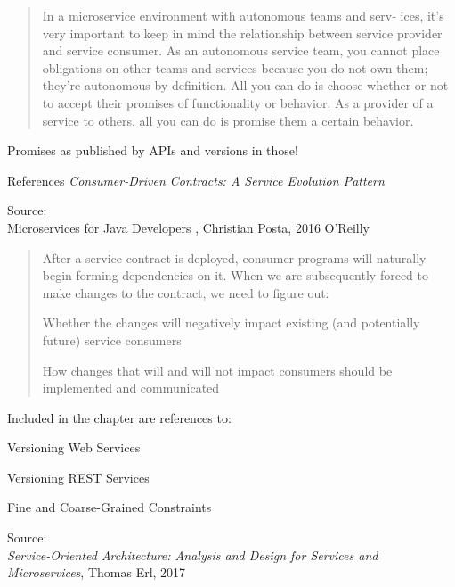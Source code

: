 \documentclass[Screen16to9,17pt]{foils}
\begin{document}

\begin{quote}
  In a microservice environment with autonomous teams and serv‐
  ices, it’s very important to keep in mind the relationship between
  service provider and service consumer. As an autonomous service
  team, you cannot place obligations on other teams and services
  because you do not own them; they’re autonomous by definition. All
  you can do is choose whether or not to accept their promises of
  functionality or behavior. As a provider of a service to others, all you
  can do is promise them a certain behavior.
\end{quote}

\begin{list2}
\item Promises as published by APIs and versions in those!
\item References \emph{Consumer-Driven Contracts: A Service Evolution Pattern}\\
\end{list2}
Source: {\footnotesize\\
Microservices for Java Developers , Christian Posta, 2016 O’Reilly}


\begin{quote}
After a service contract is deployed, consumer programs will naturally begin forming dependencies on it. When we are subsequently forced to make changes
 to the contract, we need to figure out:
\begin{list2}
\item Whether the changes will negatively impact existing (and potentially future) service consumers
\item How changes that will and will not impact consumers should be implemented and communicated
\end{list2}
\end{quote}

Included in the chapter are references to:
\begin{list2}
\item Versioning Web Services
\item Versioning REST Services
\item Fine and Coarse-Grained Constraints
\end{list2}
Source: {\footnotesize\\
\emph{Service‑Oriented Architecture: Analysis and Design for Services and Microservices}, Thomas Erl, 2017}
\end{document}
